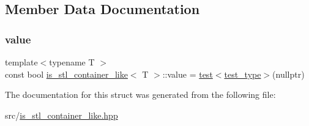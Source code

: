 \subsection{Member Data Documentation}
\mbox{\label{structis__stl__container__like_a78703ef8497a4ebf27445e64d2eba742}} 
\subsubsection{\texorpdfstring{value}{value}}
{\footnotesize\ttfamily template$<$typename T $>$ \\
const bool \hyperlink{structis__stl__container__like}{is\+\_\+stl\+\_\+container\+\_\+like}$<$ T $>$\+::value = \hyperlink{structis__stl__container__like_ada5dd0e7feabf4e4f7fe79db7de5d31d}{test}$<$\hyperlink{structis__stl__container__like_a4963c0bde8b0f68013b20041308b82e5}{test\+\_\+type}$>$(nullptr)\hspace{0.3cm}{\ttfamily [static]}}



The documentation for this struct was generated from the following file\+:\begin{DoxyCompactItemize}
\item 
src/\hyperlink{is__stl__container__like_8hpp}{is\+\_\+stl\+\_\+container\+\_\+like.\+hpp}\end{DoxyCompactItemize}
